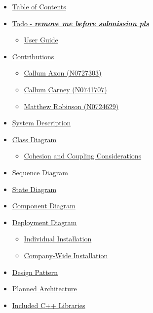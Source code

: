 \documentclass[
  english,
  a4paper,
,tablecaptionabove
]{scrartcl}
\providecommand{\tightlist}{%
  \setlength{\itemsep}{0pt}\setlength{\parskip}{0pt}}
\begin{document}
\begin{itemize}
\tightlist
\item
  \protect\hyperlink{table-of-contents}{Table of Contents}
\item
  \protect\hyperlink{todo---remove-me-before-submission-pls}{Todo -
  \textbf{\emph{remove me before submission pls}}}

  \begin{itemize}
  \tightlist
  \item
    \protect\hyperlink{user-guide}{User Guide}
  \end{itemize}
\item
  \protect\hyperlink{contributions}{Contributions}

  \begin{itemize}
  \tightlist
  \item
    \protect\hyperlink{callum-axon-n0727303}{Callum Axon (N0727303)}
  \item
    \protect\hyperlink{callum-carney-n0741707}{Callum Carney (N0741707)}
  \item
    \protect\hyperlink{matthew-robinson-n0724629}{Matthew Robinson
    (N0724629)}
  \end{itemize}
\item
  \protect\hyperlink{system-description}{System Description}
\item
  \protect\hyperlink{class-diagram}{Class Diagram}

  \begin{itemize}
  \tightlist
  \item
    \protect\hyperlink{cohesion-and-coupling-considerations}{Cohesion
    and Coupling Considerations}
  \end{itemize}
\item
  \protect\hyperlink{sequence-diagram}{Sequence Diagram}
\item
  \protect\hyperlink{state-diagram}{State Diagram}
\item
  \protect\hyperlink{component-diagram}{Component Diagram}
\item
  \protect\hyperlink{deployment-diagram}{Deployment Diagram}

  \begin{itemize}
  \tightlist
  \item
    \protect\hyperlink{individual-installation}{Individual Installation}
  \item
    \protect\hyperlink{company-wide-installation}{Company-Wide
    Installation}
  \end{itemize}
\item
  \protect\hyperlink{design-pattern}{Design Pattern}
\item
  \protect\hyperlink{planned-architecture}{Planned Architecture}
\item
  \protect\hyperlink{included-c-libraries}{Included C++ Libraries}


\end{itemize}
\end{document}
